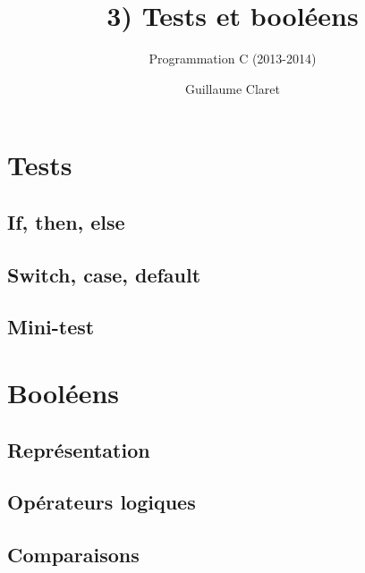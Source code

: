 \documentclass[a4paper,10pt]{article}
\begin{document}
  \title{3) Tests et booléens}
  \author{Programmation C (2013-2014)}
  \date{Guillaume Claret}
  \maketitle
  
  \section{Tests}
  \subsection{If, then, else}
  
  
  \subsection{Switch, case, default}
  \subsection{Mini-test}
  
  \section{Booléens}
  \subsection{Représentation}
  \subsection{Opérateurs logiques}
  \subsection{Comparaisons}
\end{document}
